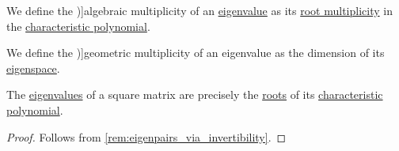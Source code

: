 \begin{definition}\label{def:eigenpair_multiplicity}
  We define the \term[ru=алгебраическая кратность, en=algebraic multiplicity (\cite[def. VI.6.17]{Aluffi2009Algebra})]{algebraic multiplicity} of an \hyperref[def:eigenpair]{eigenvalue} as its \hyperref[def:multiple_root]{root multiplicity} in the \hyperref[def:linear_operator_characteristic_polynomial]{characteristic polynomial}.

  We define the \term[ru=геометрическая кратность, en=geometric multiplicity (\cite[def. VI.6.20]{Aluffi2009Algebra})]{geometric multiplicity} of an eigenvalue as the dimension of its \hyperref[def:eigenspace]{eigenspace}.
\end{definition}

\begin{proposition}\label{thm:eigenvalues_and_characteristic_polynomials}
  The \hyperref[def:eigenpair]{eigenvalues} of a square matrix are precisely the \hyperref[def:multiple_root]{roots} of its \hyperref[def:linear_operator_characteristic_polynomial]{characteristic polynomial}.
\end{proposition}
\begin{proof}
  Follows from \cref{rem:eigenpairs_via_invertibility}.
\end{proof}

